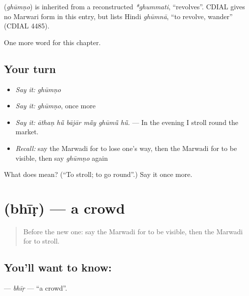 \begin{cousinweb}
\textbf{} (\emph{ghūmṇo}) is inherited from a reconstructed \emph{*ghummati}, \textquotedblleft{}revolves\textquotedblright{}. CDIAL gives no Marwari form in this entry, but lists Hindi \emph{ghūmnā}, \textquotedblleft{}to revolve, wander\textquotedblright{} (CDIAL 4485).
\end{cousinweb}

\begin{grammarlens}[title={What you've built}]
One more word for this chapter.
\end{grammarlens}

\subsection*{Your turn}
\begin{itemize}
\raggedright
  \item \emph{Say it:} \emph{ghūmṇo}
  \item \emph{Say it:} \emph{ghūmṇo}, once more
  \item \emph{Say it:} \emph{āthaṇ hū̃ bājār mā̃y ghūmū̃ hū̃.} — In the evening I stroll round the market.
  \item \emph{Recall:} say the Marwadi for to lose one's way, then the Marwadi for to be visible, then say \emph{ghūmṇo} again
\end{itemize}

\begin{tcolorbox}[breakable,colback=teal!4,colframe=teal!35!black,title={Before you move on}]
What does  mean? (\textquotedblleft{}To stroll; to go round\textquotedblright{}.) Say it once more.
\end{tcolorbox}
\section[\texorpdfstring{\mw{भीड़} (bhīṛ)}{भीड़ (bhīṛ)}]{ (bhīṛ) — a crowd}

\label{lesson:MW-C204-bhir}



\begin{quote}
Before the new one: say the Marwadi for to be visible, then the Marwadi for to stroll.
\end{quote}

\subsection*{You'll want to know: }
\textbf{} — \emph{bhīṛ} — \textquotedblleft{}a crowd\textquotedblright{}.

